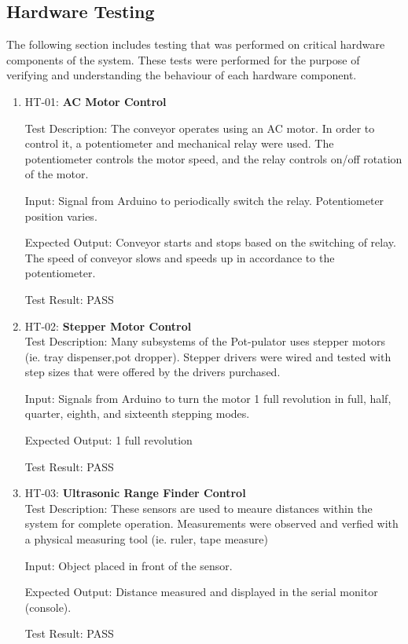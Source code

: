 \documentclass[12pt, titlepage]{article}
\begin{document}
  \subsection{Hardware Testing}
  The following section includes testing that was performed on critical hardware components
  of the system. These tests were performed for the purpose of verifying and understanding the  
  behaviour of each hardware component.
  \begin{enumerate}
  \item{HT-01: \textbf{AC Motor Control}}
  
  Test Description: The conveyor operates using an AC motor. In order to control it,
  a potentiometer and mechanical relay were used. The potentiometer controls the motor speed,
  and the relay controls on/off rotation of the motor.

  Input: Signal from Arduino to periodically switch the relay. Potentiometer position varies.

  Expected Output: Conveyor starts and stops based on the switching of relay. The speed of conveyor slows and speeds up
  in accordance to the potentiometer.

  Test Result: PASS
  \\
  \item{HT-02: \textbf{Stepper Motor Control}}\\
  Test Description: Many subsystems of the Pot-pulator uses stepper motors (ie. tray dispenser,pot dropper).
   Stepper drivers were wired and tested with step sizes that were offered by 
   the drivers purchased. 

  Input: Signals from Arduino to turn the motor 1 full revolution in full, half, quarter,
  eighth, and sixteenth stepping modes.

  Expected Output: 1 full revolution

  Test Result: PASS
  \\
  \item{HT-03: \textbf{Ultrasonic Range Finder Control}}\\
  Test Description: These sensors are used to meaure distances within the system for complete
  operation. Measurements were observed and verfied with a physical measuring tool (ie. ruler, tape measure)

  Input: Object placed in front of the sensor.

  Expected Output: Distance measured and displayed in the serial monitor (console).

  Test Result: PASS
\end{enumerate}
\end{document}
